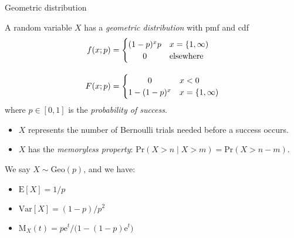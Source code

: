 \documentclass[8pt, handout]{beamer}
\renewcommand{\emph}[1]{\textcolor{defcol}{\textsl{#1}}}
\begin{document}
\begin{frame}{Geometric distribution}

    A random variable \(X\) has a \emph{geometric distribution} with pmf and cdf
    \begin{align*}
        f(x;p) &= \begin{cases}
            (1 - p)^x p & x = \{ 1, \infty ) \\
            \hfil 0 & \text{elsewhere}
        \end{cases} \\[1em]
        F(x;p) &= \begin{cases}
            \hfil 0 & x < 0 \\
            1 - (1 - p)^x & x = \{ 1, \infty )
        \end{cases}
    \end{align*}
    where \(p \in [0,1]\) is the \emph{probability of success}.
    \begin{itemize}
        \item \(X\) represents the number of Bernoulli trials needed before a success occurs. 
        \item \(X\) has the \emph{memoryless property}: \(\mathrm{Pr}(X > n \;|\; X > m) = \mathrm{Pr}(X > n - m)\).
    \end{itemize}

    \vspace{2em}
    We say \(X \sim \mathrm{Geo}(p)\), and we have:
    \begin{itemize}
        \item \(\mathrm{E}[X] = 1/p\)
        \item \(\mathrm{Var}[X] = (1 - p)/p^2\)
        \item \(\mathrm{M}_X(t) = p \mathrm{e}^t / \big( 1 - (1 - p)\mathrm{e}^t \big)\)
    \end{itemize}

\end{frame}
\end{document}
